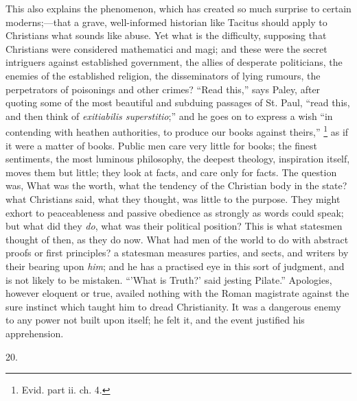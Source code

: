 This also explains the phenomenon, which has created so much surprise to certain moderns;—that a grave,
well-informed historian like Tacitus should apply to
Christians what sounds like abuse. Yet what is the
difficulty, supposing that Christians were considered
mathematici and magi; and these were the secret
intriguers against established government, the allies of
desperate politicians, the enemies of the established
religion, the disseminators of lying rumours, the
perpetrators of poisonings and other crimes? ``Read
this,'' says Paley, after quoting some of the most
beautiful and subduing passages of St. Paul, ``read
this, and then think of \emph{exitiabilis superstitio};''
and he goes on to express a wish ``in contending with
heathen authorities, to produce our books against
theirs,'' \footnote{Evid. part ii. ch. 4.} as if it were a matter of books. Public men care
very little for books; the finest sentiments, the most
luminous philosophy, the deepest theology, inspiration
itself, moves them but little; they look at facts, and
care only for facts. The question was, What was the
worth, what the tendency of the Christian body in the
state? what Christians said, what they thought, was
little to the purpose. They might exhort to peaceableness
and passive obedience as strongly as words could speak;
but what did they \emph{do}, what was their political
position? This is what statesmen thought of then, as they
do now. What had men of the world to do with abstract
proofs or first principles? a statesman measures parties,
and sects, and writers by their bearing upon \emph{him};
and he has a practised eye in this sort of judgment, and
is not likely to be mistaken. ``'What is Truth?' said
jesting Pilate.'' Apologies, however eloquent or
true, availed nothing with the Roman magistrate against
the sure instinct which taught him to dread Christianity.
It was a dangerous enemy to any power not built upon
itself; he felt it, and the event justified his
apprehension.

20.

